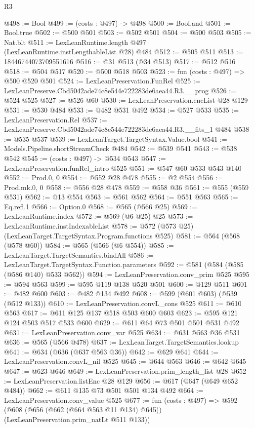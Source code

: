 \begin{lexlean}{R3}
\begin{coremodule}
@498 := Bool
@499 := (costs : @497) -> @498
@500 := Bool.and
@501 := Bool.true
@502 := @500 @501
@503 := @502 @501
@504 := @500 @503
@505 := Nat.blt
@511 := LexLeanRuntime.length @497 (LexLeanRuntime.instLengthableList @28) @484
@512 := @505 @511
@513 := 18446744073709551616
@516 := @31 @513 (@34 @513)
@517 := @512 @516
@518 := @504 @517
@520 := @500 @518 @503
@523 := fun (costs : @497) => @500 @520 @501
@524 := LexLeanPreservation.FunRel
@525 := LexLeanPreserve.Cbd5042ade74c8e544e722283de6aea44.R3.__prog
@526 := @524 @525
@527 := @526 @60
@530 := LexLeanPreservation.encList @28 @129
@531 := @530 @484
@533 := @482 @531 @492
@534 := @527 @533
@535 := LexLeanPreservation.Rel
@537 := LexLeanPreserve.Cbd5042ade74c8e544e722283de6aea44.R3.__fits_1 @484
@538 := @535 @537
@539 := LexLeanTarget.TargetSyntax.Value.bool
@541 := Models.Pipeline.shortStreamCheck @484
@542 := @539 @541
@543 := @538 @542
@545 := (costs : @497) -> @534 @543
@547 := LexLeanPreservation.funRel_intro @525
@551 := @547 @60 @533 @543 @140
@552 := Prod.{0, 0}
@554 := @552 @28 @478
@555 := @2 @554
@556 := Prod.mk.{0, 0}
@558 := @556 @28 @478
@559 := @558 @36
@561 := @555 (@559 @531)
@562 := @13 @554
@563 := @561 @562
@564 := @551 @563
@565 := Eq.refl.{1}
@566 := Option.{0}
@568 := @565 (@566 @25)
@569 := LexLeanRuntime.index
@572 := @569 (@6 @25) @25
@573 := LexLeanRuntime.instIndexableList
@578 := @572 (@573 @25) (LexLeanTarget.TargetSyntax.Program.functions @525)
@581 := @564 (@568 (@578 @60))
@584 := @565 (@566 (@6 @554))
@585 := LexLeanTarget.TargetSemantics.bindAll
@586 := LexLeanTarget.TargetSyntax.Function.parameters
@592 := @581 (@584 (@585 (@586 @140) @533 @562))
@594 := LexLeanPreservation.conv_prim @525
@595 := @594 @563
@599 := @595 @119 @138 @520 @501
@600 := @129 @511
@601 := @482 @600
@603 := @482 @134 @492
@608 := @599 (@601 @603) (@539 (@512 @133))
@610 := LexLeanPreservation.convL_cons @525
@611 := @610 @563
@617 := @611 @125 @137 @518 @503 @600 @603
@623 := @595 @121 @124 @503 @517 @533 @600
@629 := @611 @64 @73 @501 @501 @531 @492
@631 := LexLeanPreservation.conv_var @525
@634 := @631 @563 @36 @531
@636 := @565 (@566 @478)
@637 := LexLeanTarget.TargetSemantics.lookup
@641 := @634 (@636 (@637 @563 @36))
@642 := @629 @641
@644 := LexLeanPreservation.convL_nil @525
@645 := @644 @563
@646 := @642 @645
@647 := @623 @646
@649 := LexLeanPreservation.prim_length_list @28
@652 := LexLeanPreservation.listEnc @28 @129
@656 := @617 (@647 (@649 @652 @484))
@662 := @611 @135 @73 @501 @501 @134 @492
@664 := LexLeanPreservation.conv_value @525
@677 := fun (costs : @497) =>
  @592 (@608 (@656 (@662 (@664 @563 @11 @134) @645)) (LexLeanPreservation.prim_natLt @511 @133))

\end{coremodule}
\end{lexlean}
